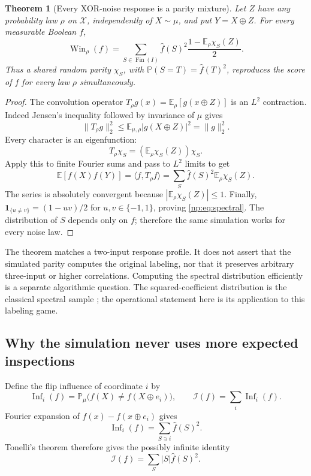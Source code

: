 \documentclass[11pt,a4paper]{article}
\newtheorem{theorem}{Theorem}[section]
\theoremstyle{definition}
\theoremstyle{remark}
\newcommand{\E}{\mathbb E}
\newcommand{\Pbb}{\mathbb P}
\newcommand{\Fin}{\operatorname{Fin}}
\newcommand{\cX}{\mathcal X}
\newcommand{\Win}{\operatorname{Win}}
\newcommand{\Inf}{\operatorname{Inf}}
\newcommand{\one}{\mathbf 1}
\begin{document}
\begin{theorem}[Every XOR-noise response is a parity mixture]
\label{np:thm:fourier}
Let \(Z\) have any probability law \(\rho\) on \(\cX\), independently of
\(X\sim\mu\), and put \(Y=X\oplus Z\). For every measurable Boolean \(f\),
\begin{equation}\label{np:eq:spectral}
 \Win_\rho(f)=
 \sum_{S\in\Fin(I)}\widehat f(S)^2
 \frac{1-\E_\rho\chi_S(Z)}2.
\end{equation}
Thus a shared random parity \(\chi_S\), with
\(\Pbb(S=T)=\widehat f(T)^2\), reproduces the score of \(f\) for every
law \(\rho\) simultaneously.
\end{theorem}

\begin{proof}
The convolution operator
\(T_\rho g(x)=\E_\rho[g(x\oplus Z)]\) is an \(L^2\) contraction.
Indeed Jensen's inequality followed by invariance of \(\mu\) gives
\[
 \|T_\rho g\|_2^2
 \le \E_{\mu,\rho}|g(X\oplus Z)|^2=\|g\|_2^2.
\]
Every character is an eigenfunction:
\[
 T_\rho\chi_S=(\E_\rho\chi_S(Z))\chi_S.
\]
Apply this to finite Fourier sums and pass to \(L^2\) limits to get
\[
 \E[f(X)f(Y)]
 =\langle f,T_\rho f\rangle
 =\sum_S\widehat f(S)^2\E_\rho\chi_S(Z).
\]
The series is absolutely convergent because
\(|\E_\rho\chi_S(Z)|\le1\). Finally,
\(\one_{\{u\ne v\}}=(1-uv)/2\) for \(u,v\in\{-1,1\}\), proving
\eqref{np:eq:spectral}. The distribution of \(S\) depends only on \(f\);
therefore the same simulation works for every noise law.
\end{proof}

The theorem matches a two-input response profile. It does not assert that
the simulated parity computes the original labeling, nor that it preserves
arbitrary three-input or higher correlations. Computing the spectral
distribution efficiently is a separate algorithmic question. The
squared-coefficient distribution is the classical spectral sample
\cite{odonnell}; the operational statement here is its application to this
labeling game.

\subsection{Why the simulation never uses more expected inspections}

Define the flip influence of coordinate \(i\) by
\[
 \Inf_i(f)=\Pbb_\mu\bigl(f(X)\ne f(X\oplus e_i)\bigr),\qquad
 \mathcal I(f)=\sum_i\Inf_i(f).
\]
Fourier expansion of \(f(x)-f(x\oplus e_i)\) gives
\[
 \Inf_i(f)=\sum_{S\ni i}\widehat f(S)^2.
\]
Tonelli's theorem therefore gives the possibly infinite identity
\begin{equation}\label{np:eq:influence}
 \mathcal I(f)=\sum_S |S|\widehat f(S)^2.
\end{equation}
\end{document}
